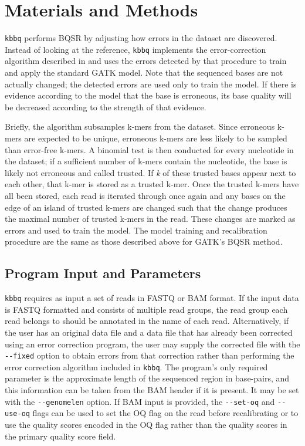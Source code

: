 \section{Materials and Methods}
\texttt{kbbq} performs BQSR by adjusting how errors in the dataset are discovered.
Instead of looking at the reference, \texttt{kbbq} implements the error-correction algorithm described in \cite{song_lighter_2014} and uses the errors detected by that procedure to train and apply the standard GATK model. Note that the sequenced bases are not actually changed; the detected errors are used only to train the model. If there is evidence according to the model that the base is erroneous, its base quality will be decreased according to the strength of that evidence.

Briefly, the algorithm subsamples k-mers from the dataset. Since erroneous k-mers are expected to be unique, erroneous k-mers are less likely to be sampled than error-free k-mers. A binomial test is then conducted for every nucleotide in the dataset; if a sufficient number of k-mers contain the nucleotide, the base is likely not erroneous and called trusted. If \textit{k} of these trusted bases appear next to each other, that k-mer is stored as a trusted k-mer. Once the trusted k-mers have all been stored, each read is iterated through once again and any bases on the edge of an island of trusted k-mers are changed such that the change produces the maximal number of trusted k-mers in the read. These changes are marked as errors and used to train the model.
The model training and recalibration procedure are the same as those described above for GATK's BQSR method.

\subsection{Program Input and Parameters}

\texttt{kbbq} requires as input a set of reads in FASTQ \parencite{cock_sanger_2010} or BAM \parencite{li_sequence_2009} format. If the input data is FASTQ formatted and consists of multiple read groups, the read group each read belongs to should be annotated in the name of each read. Alternatively, if the user has an original data file and a data file that has already been corrected using an error correction program, the user may supply the corrected file with the \texttt{-\phantom{}-fixed} option to obtain errors from that correction rather than performing the error correction algorithm included in \texttt{kbbq}. The program's only required parameter is the approximate length of the sequenced region in base-pairs, and this information can be taken from the BAM header if it is present. It may be set with the \texttt{-\phantom{}-genomelen} option. If BAM input is provided, the \texttt{-\phantom{}-set-oq} and \texttt{-\phantom{}-use-oq} flags can be used to set the OQ flag on the read before recalibrating or to use the quality scores encoded in the OQ flag rather than the quality scores in the primary quality score field.

